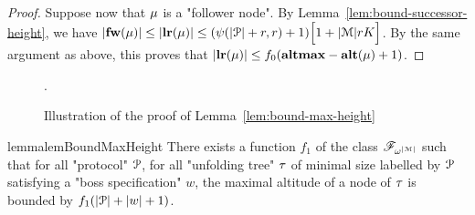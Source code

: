 \begin{proof}
	Suppose now that $\mu$ is a "follower node". By Lemma~\ref{lem:bound-successor-height}, we have 
	$|\mathbf{fw}(\mu)| \leq |\mathbf{lr}(\mu)| \leq (\psi(|\mathcal{P}|+r,r)+1) \Big[1+|\mathcal{M}|rK\Big]$.
	By the same argument as above, this proves that $|\mathbf{lr}(\mu)| \leq f_0(\mathbf{altmax} - \mathbf{alt}(\mu)+1)$.
\end{proof}




\begin{figure}[h]
	
	\caption{Illustration of the proof of Lemma~\ref{lem:bound-max-height}}.
	\label{fig:max-height-bound}
\end{figure}
\begin{restatable}{lemma}{lemBoundMaxHeight}
	\label{lem:bound-max-height}
	There exists a function $f_1$ of the class $\mathscr{F}_{\omega^{|\mathcal{M}|}}$ such that for all "protocol" $\mathcal{P}$, for all "unfolding tree" $\tau$ of minimal size labelled by $\mathcal{P}$ satisfying a "boss specification" $w$, the maximal altitude of a node of $\tau$ is bounded by $f_1(|\mathcal{P}| + |w|+1)$.
\end{restatable}
